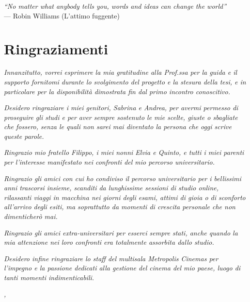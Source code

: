 \cleardoublepage
{}
{}

\begin{flushright}{
    \slshape
    ``No matter what anybody tells you, words and ideas can change the world''} \\
    \medskip
    --- Robin Williams (L'attimo fuggente)
\end{flushright}


\bigskip

\begingroup
\let\clearpage\relax
\let\cleardoublepage\relax
\let\cleardoublepage\relax

\chapter*{Ringraziamenti}

\par \textit{Innanzitutto, vorrei esprimere la mia gratitudine alla Prof.ssa \myProf{} per la guida e il supporto fornitomi durante lo svolgimento del progetto e la stesura della tesi, e in particolare per la disponibilità dimostrata fin dal primo incontro conoscitivo.}

\vspace{10pt}
\par\noindent \textit{Desidero ringraziare i miei genitori, Sabrina e Andrea, per avermi permesso di proseguire gli studi e per aver sempre sostenuto le mie scelte, giuste o sbagliate che fossero, senza le quali non sarei mai diventato la persona che oggi scrive queste parole.}

\vspace{10pt}
\par\noindent \textit{Ringrazio mio fratello Filippo, i miei nonni Elvia e Quinto, e tutti i miei parenti per l’interesse manifestato nei confronti del mio percorso universitario.}

\vspace{10pt}
\par\noindent \textit{Ringrazio gli amici con cui ho condiviso il percorso universitario per i bellissimi anni trascorsi insieme, scanditi da lunghissime sessioni di studio online, rilassanti viaggi in macchina nei giorni degli esami, attimi di gioia o di sconforto all’arrivo degli esiti, ma soprattutto da momenti di crescita personale che non dimenticherò mai.}

\vspace{10pt}
\par\noindent \textit{Ringrazio gli amici extra-universitari per esserci sempre stati, anche quando la mia attenzione nei loro confronti era totalmente assorbita dallo studio.}

\vspace{10pt}
\par\noindent \textit{Desidero infine ringraziare lo staff del multisala Metropolis Cinemas per l’impegno e la passione dedicati alla gestione del cinema del mio paese, luogo di tanti momenti indimenticabili.}
\bigskip

\noindent\textit{\myLocation, \myTime}
\hfill \myName

\endgroup

